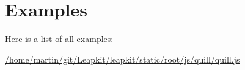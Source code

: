 \section{Examples}
Here is a list of all examples\-:\begin{DoxyCompactItemize}
\item 
\hyperlink{_2home_2martin_2git_2_leapkit_2leapkit_2static_2root_2js_2quill_2quill_8js-example}{/home/martin/git/\-Leapkit/leapkit/static/root/js/quill/quill.\-js}
\end{DoxyCompactItemize}
